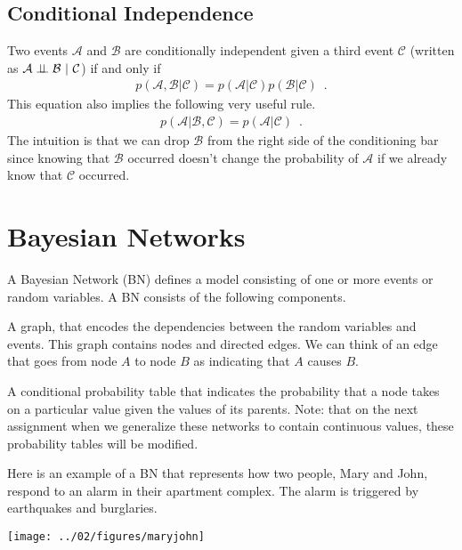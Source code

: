 \documentclass{tufte-handout}
\begin{document}
\subsection{Conditional Independence}


Two events $\mathcal{A}$ and $\mathcal{B}$ are conditionally independent given a third event $\mathcal{C}$ (written as $\mathcal{A} \perp\!\!\!\perp \mathcal{B}~|~\mathcal{C}$) if and only if
\begin{align}
p(\mathcal{A}, \mathcal{B} | \mathcal{C}) = p(\mathcal{A} | \mathcal{C}) p(\mathcal{B} | \mathcal{C}) \enspace .
\end{align}
This equation also implies the following very useful rule.
\begin{align}
p(\mathcal{A} | \mathcal{B}, \mathcal{C}) = p(\mathcal{A} | \mathcal{C}) \enspace .
\end{align}
The intuition is that we can drop $\mathcal{B}$ from the right side of the conditioning bar since knowing that $\mathcal{B}$ occurred doesn't change the probability of $\mathcal{A}$ if we already know that $\mathcal{C}$ occurred.


\section{Bayesian Networks}

A Bayesian Network (BN) defines a model consisting of one or more events or random variables.  A BN consists of the following components.
\bi
\item A graph, that encodes the dependencies between the random variables and events.  This graph contains nodes and directed edges.  We can think of an edge that goes from node $A$ to node $B$ as indicating that $A$ causes $B$.
\item A conditional probability table that indicates the probability that a node takes on a particular value given the values of its parents.  Note: that on the next assignment when we generalize these networks to contain continuous values, these probability tables will be modified.
\ei

Here is an example of a BN that represents how two people, Mary and John, respond to an alarm in their apartment complex.  The alarm is triggered by earthquakes and burglaries.

\begin{center}
\texttt{[image: ../02/figures/maryjohn]}
\end{center}
\end{document}
